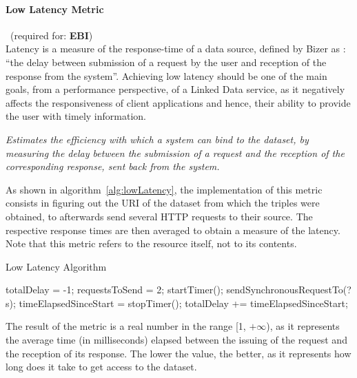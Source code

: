 \paragraph{Low Latency Metric}~(required for: \textbf{EBI}) ~\\ %
Latency is a measure of the response-time of a data source, defined by Bizer as \cite{Bizer2008:PhDThesis:biblatex}: ``the delay between submission of a request by the user and reception of the response from the system''. Achieving low latency should be one of the main goals, from a performance perspective, of a Linked Data service, as it negatively affects the responsiveness of client applications and hence, their ability to provide the user with timely information.
\begin{mdframed}[style=metricdefinition]
\emph{Estimates the efficiency with which a system can bind to the dataset, by measuring the delay between the submission of a request  and the reception of the corresponding response, sent back from the system.}
\end{mdframed}

As shown in algorithm~\ref{alg:lowLatency}, the implementation of this metric consists in figuring out the URI of the dataset from which the triples were obtained, to afterwards send several HTTP requests to their source. The respective response times are then averaged to obtain a measure of the latency. Note that this metric refers to the resource itself, not to its contents.
\begin{algorithm}
\caption{Low Latency Algorithm} \label{alg:lowLatency}
\begin{algorithmic}[1]
\State totalDelay = -1;
\State requestsToSend = 2;
\EndProcedure
{}
\State startTimer();
\State sendSynchronousRequestTo(?s);
\EndFor
\State timeElapsedSinceStart = stopTimer();
\State totalDelay += timeElapsedSinceStart;
\EndIf
{}
\EndProcedure
\end{algorithmic}
\end{algorithm}
The result of the metric is a real number in the range [1, $+\infty$), as it represents the average time (in  milliseconds) elapsed between the issuing of the request and the reception of its response. The lower the value, the better, as it represents how long does it take to get access to the dataset.

